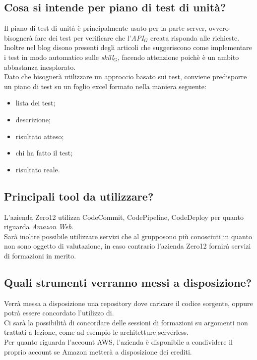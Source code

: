 \documentclass[a4paper,12pt]{article}
\begin{document}
	\subsection{Cosa si intende per piano di test di unità?}
	Il piano di test di unità è principalmente usato per la parte server, ovvero bisognerà fare dei test per verificare che l'\textit{API$_{G}$} creata risponda alle richieste. \\
	Inoltre nel blog disono presenti degli articoli che suggeriscono come implementare i test in modo  automatico sulle \textit{skill$_{G}$}, facendo attenzione poichè è un ambito abbastanza inesplorato. \\
	Dato che bisognerà utilizzare un approccio basato sui test, conviene predisporre un piano di test su un foglio excel formato nella maniera seguente:
	\begin{itemize}
		\item lista dei test;
		\item descrizione;
		\item risultato atteso;
		\item chi ha fatto il test;
		\item risultato reale.
	\end{itemize}
	
	\subsection{Principali tool da utilizzare?}
	L'azienda Zero12 utilizza CodeCommit, CodePipeline, CodeDeploy per quanto riguarda \textit{Amazon Web}. \\
	Sarà inoltre possibile utilizzare servizi che al grupposono più conosciuti in quanto non sono oggetto di valutazione, in caso contrario l'azienda Zero12 fornirà servizi di formazioni in merito.
	
	\subsection{Quali strumenti verranno messi a disposizione?}
	Verrà messa a disposizione una repository dove caricare il codice sorgente, oppure potrà essere concordato l'utilizzo di. \\
	Ci sarà la possibilità di concordare delle sessioni di formazioni su argomenti non trattati a lezione, come ad esempio le architetture serverless. \\
	Per quanto riguarda l'account AWS, l'azienda è disponibile a condividere il proprio account se Amazon metterà a disposizione dei crediti.	
	\label{LastPage}
\end{document}

